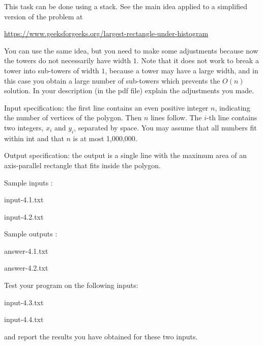 \documentclass[11pt]{article}
\begin{document}
\quad\quad
{}



This task can be done using a stack. See the main idea applied to a simplified version of the problem at

\url{https://www.geeksforgeeks.org/largest-rectangle-under-histogram}

You can use the same idea, but you need to make some adjustments because now the towers do not necessarily have width $1$. Note that it does not work to break a tower into sub-towers of width $1$, because a tower may have a large width, and in this case you obtain a large number of sub-towers which prevents the $O(n)$ solution. In your description (in the pdf file) explain the adjustments you made.



Input specification: the first line contains an even positive integer $n$, indicating the number of vertices of the polygon. Then $n$ lines follow. The $i$-th line contains two integers, $x_i$ and $y_i$, separated by space. You may assume that all numbers fit within int and that $n$  is at most 1,000,000. 

Output specification: the output is a single line with the maximum area of an axis-parallel rectangle that fits inside the polygon. 



Sample inputs :
 
input-4.1.txt

input-4.2.txt


Sample outputs :
 
  answer-4.1.txt  

 answer-4.2.txt  

\medskip

Test your program on the following inputs:

input-4.3.txt 

input-4.4.txt 

and report the results you have obtained for these two inputs.

\fi
\end{document}

